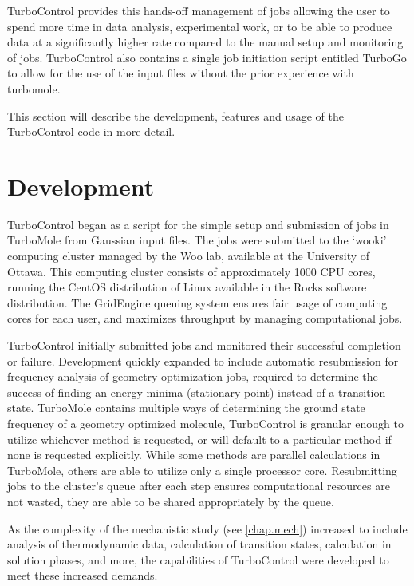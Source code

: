 TurboControl provides this hands-off management of jobs allowing the user to spend more time in data analysis, experimental work, or to be able to produce data at a significantly higher rate compared to the manual setup and monitoring of jobs. TurboControl also contains a single job initiation script entitled TurboGo to allow for the use of the input files without the prior experience with turbomole.

This section will describe the development, features and usage of the TurboControl code in more detail. 

\section{Development}

TurboControl began as a script for the simple setup and submission of jobs in TurboMole from Gaussian input files. The jobs were submitted to the `wooki' computing cluster managed by the Woo lab, available at the University of Ottawa. This computing cluster consists of approximately 1000 CPU cores, running the CentOS distribution of Linux available in the Rocks software distribution. The GridEngine queuing system ensures fair usage of computing cores for each user, and maximizes throughput by managing computational jobs. 

TurboControl initially submitted jobs and monitored their successful completion or failure. Development quickly expanded to include automatic resubmission for frequency analysis of geometry optimization jobs, required to determine the success of finding an energy minima (stationary point) instead of a transition state. TurboMole contains multiple ways of determining the ground state frequency of a geometry optimized molecule, TurboControl is granular enough to utilize whichever method is requested, or will default to a particular method if none is requested explicitly. While some methods are parallel calculations in TurboMole, others are able to utilize only a single processor core. Resubmitting jobs to the cluster's queue after each step ensures computational resources are not wasted, they are able to be shared appropriately by the queue.

As the complexity of the mechanistic study (see \autoref{chap.mech}) increased to include analysis of thermodynamic data, calculation of transition states, calculation in solution phases, and more, the capabilities of TurboControl were developed to meet these increased demands. 

